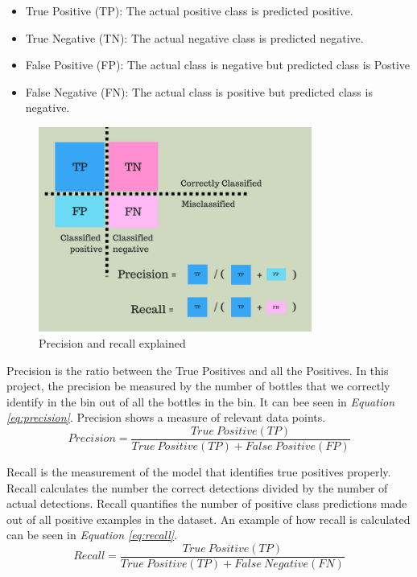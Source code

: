 \begin{itemize}
    \item True Positive (TP): The actual positive class is predicted positive.
    \item True Negative (TN): The actual negative class is predicted negative.
    \item False Positive (FP): The actual class is negative but predicted class is Postive
    \item False Negative (FN): The actual class is positive but predicted class is negative.
\end{itemize}

\begin{figure}[h]
    \centering
    \includegraphics[width=0.8\textwidth]{graphics/Precisionrecall.png}
    \caption{Precision and recall explained \cite{mittapally_whats_2019}}
    \label{fig:precisionrecall}
\end{figure}



Precision is the ratio between the True Positives and all the Positives. In this project, the precision be measured by the number of bottles that we correctly identify in the bin out of all the bottles in the bin. It can bee seen in \textit{Equation \ref{eq:precision}}. Precision shows a measure of relevant data points\cite{shung_accuracy_2020}.
\begin{equation}
    Precision = \frac{True\ Positive(TP)}{True\ Positive(TP)+False \ Positive(FP)}
    \label{eq:precision}
\end{equation}


Recall is the measurement of the model that identifies true positives properly. Recall calculates the number the correct detections divided by the number of actual detections\cite{shung_accuracy_2020}. Recall quantifies the number of positive class predictions made out of all positive examples in the dataset. An example of how recall is calculated can be seen in \textit{Equation \ref{eq:recall}}.
\begin{equation}
    Recall = \frac{True\ Positive(TP)}{True\ Positive(TP)+False \ Negative(FN)}
    \label{eq:recall}
\end{equation}

